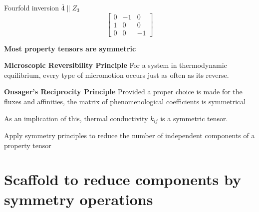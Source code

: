 Fourfold inversion $\bar{4} \parallel Z_3$
\begin{equation*}
\left[
\begin{array}{lll}
0 & -1 & 0 \\
1 & 0 & 0 \\
0 & 0 & -1 
\end{array}
\right]
\end{equation*}



{\bf Most property tensors are symmetric}

{\bf Microscopic Reversibility Principle}
For a system in thermodynamic equilibrium, every type of micromotion occurs just as often as its reverse.

{\bf Onsager's Reciprocity Principle}
Provided a proper choice is made for the fluxes and affinities, the matrix of phenomenological coefficients is symmetrical

As an implication of this, thermal conductivity $k_{ij}$ is a symmetric tensor.


\begin {lo3} [Tensors]
Apply symmetry principles to reduce the number of independent components of a property tensor
\end {lo3}

\section{Scaffold to reduce components by symmetry operations}

